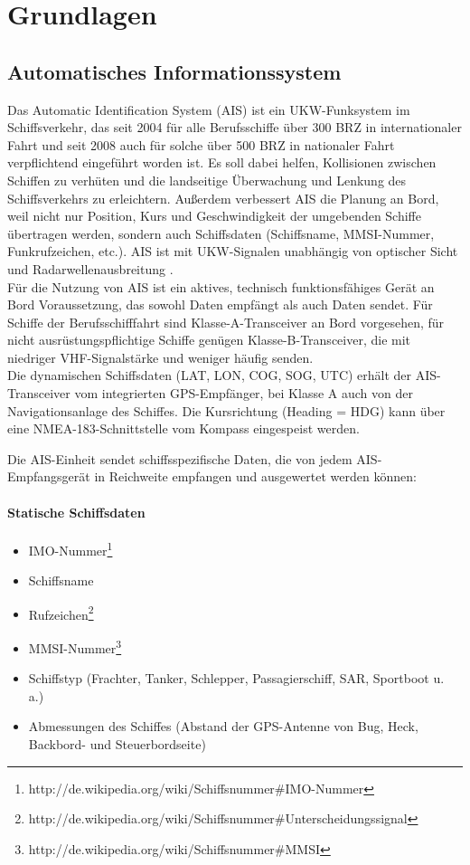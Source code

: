 \chapter{Grundlagen}\label{s.Grundlagen}
\section{Automatisches Informationssystem}\label{s.Automatisches Informationssystem (AIS)}
Das Automatic Identification System (AIS) ist ein UKW-Funksystem im Schiffsverkehr, das seit 2004 für alle Berufsschiffe über 300 BRZ in internationaler Fahrt und seit 2008 auch für solche über 500 BRZ in nationaler Fahrt verpflichtend eingeführt worden ist. Es soll dabei helfen, Kollisionen zwischen Schiffen zu verhüten und die landseitige Überwachung und Lenkung des Schiffsverkehrs zu erleichtern. Außerdem verbessert AIS die Planung an Bord, weil nicht nur Position, Kurs und Geschwindigkeit der umgebenden Schiffe übertragen werden, sondern auch Schiffsdaten (Schiffsname, MMSI-Nummer, Funkrufzeichen, etc.). AIS ist mit UKW-Signalen unabhängig von optischer Sicht und Radarwellenausbreitung \cite{wiki:ais}.\\
Für die Nutzung von AIS ist ein aktives, technisch funktionsfähiges Gerät an Bord Voraussetzung, das sowohl Daten empfängt als auch Daten sendet. Für Schiffe der Berufsschifffahrt sind Klasse-A-Transceiver an Bord vorgesehen, für nicht ausrüstungspflichtige Schiffe genügen Klasse-B-Transceiver, die mit niedriger VHF-Signalstärke und weniger häufig senden.  \\
Die dynamischen Schiffsdaten (LAT, LON, COG, SOG, UTC) erhält der AIS-Transceiver vom integrierten GPS-Empfänger, bei Klasse A auch von der Navigationsanlage des Schiffes. Die Kursrichtung (Heading =  HDG) kann über eine NMEA-183-Schnittstelle vom Kompass eingespeist werden.

Die AIS-Einheit sendet schiffsspezifische Daten, die von jedem AIS-Empfangsgerät in Reichweite empfangen und ausgewertet werden können:
\subsubsection{Statische Schiffsdaten} \label{Statische Schiffsdaten}
\begin{itemize}
\item IMO-Nummer\footnote{http://de.wikipedia.org/wiki/Schiffsnummer\#IMO-Nummer}
\item Schiffsname
\item Rufzeichen\footnote{http://de.wikipedia.org/wiki/Schiffsnummer\#Unterscheidungssignal}
\item MMSI-Nummer\footnote{http://de.wikipedia.org/wiki/Schiffsnummer\#MMSI}
\item Schiffstyp (Frachter, Tanker, Schlepper, Passagierschiff, SAR, Sportboot u. a.)
\item Abmessungen des Schiffes (Abstand der GPS-Antenne von Bug, Heck, Backbord- und Steuerbordseite)
\end{itemize}

